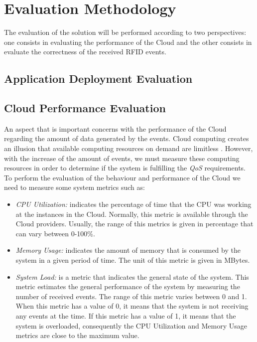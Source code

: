\section{Evaluation Methodology}
\label{sec:evaluation}
The evaluation of the solution will be performed according to two perspectives: one consists in
evaluating the performance of the Cloud and the other consists in evaluate the correctness of
the received RFID events.
\subsection{Application Deployment Evaluation}
\label{sub:application_deployment_evaluation}
\subsection{Cloud Performance Evaluation}
\label{subs:cloud_performance_evaluation}
An aspect that is important concerns with the performance of the Cloud regarding the amount
of data generated by the events. Cloud computing creates an illusion that available computing
resources on demand are limitless \cite{armbrust2009m}. However, with the increase of the amount of
events, we must measure these computing resources in order to determine if the system is fulfilling
the \textit{QoS} requirements. To perform the evaluation of the behaviour and performance of the Cloud
we need to measure some system metrics such as:
\begin{itemize}
  \item \textit{CPU Utilization:} indicates the percentage of time that the CPU was working at
  the instances in the Cloud. Normally, this metric is available through the Cloud providers.
  Usually, the range of this metrics is given in percentage that can vary between 0-100\%.
  \item \textit{Memory Usage:} indicates the amount of memory that is consumed by the system in a
  given period of time. The unit of this metric is given in MBytes.
  \item \textit{System Load:} is a metric that indicates the general state of the system.
  This metric estimates the general performance of the system by measuring the number of received events.
  The range of this metric varies between 0 and 1. When this metric has a value of 0, it means that the
  system is not receiving any events at the time. If this metric has a value of 1, it means that the system
  is overloaded, consequently the CPU Utilization and Memory Usage metrics are close to the maximum value.
\end{itemize}
